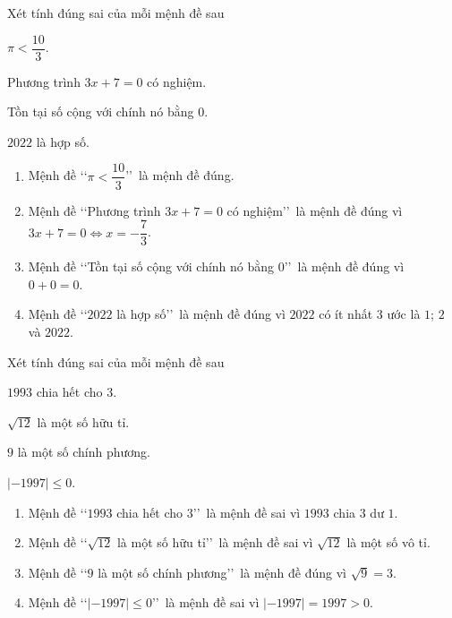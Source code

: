\begin{bt}%
	Xét tính đúng sai của mỗi mệnh đề sau
	\begin{listEX}[2]
		\item $\pi<\dfrac{10}{3}$.
		\item Phương trình $3x+7=0$ có nghiệm.
		\item Tồn tại số cộng với chính nó bằng $0$.
		\item $2022$ là hợp số.
	\end{listEX}
	\loigiai
	{
		\begin{enumerate}
			\item Mệnh đề \lq\lq  $\pi<\dfrac{10}{3}$\rq\rq\ là mệnh đề đúng.
			\item Mệnh đề \lq\lq  Phương trình $3x+7=0$ có nghiệm\rq\rq\ là mệnh đề đúng vì $3x+7=0 \Leftrightarrow x=-\dfrac{7}{3}$.
			\item Mệnh đề \lq\lq  Tồn tại số cộng với chính nó bằng $0$\rq\rq\ là mệnh đề đúng vì $0+0=0$.
			\item Mệnh đề \lq\lq  $2022$ là hợp số\rq\rq\ là mệnh đề đúng vì $2022$ có ít nhất $3$ ước là $1$; $2$ và $2022$.
		\end{enumerate}
	}
\end{bt}

\begin{bt}%
	Xét tính đúng sai của mỗi mệnh đề sau
	\begin{listEX}[2]
		\item $1993$ chia hết cho $3$.
		\item $\sqrt{12}$ là một số hữu tỉ.
		\item $9$ là một số chính phương.
		\item $|-1997|\leqslant0$.
	\end{listEX}
	\loigiai
	{
		\begin{enumerate}
			\item Mệnh đề \lq\lq  $1993$ chia hết cho $3$\rq\rq\ là mệnh đề sai vì $1993$ chia $3$ dư $1$.
			\item Mệnh đề \lq\lq  $\sqrt{12}$ là một số hữu tỉ\rq\rq\ là mệnh đề sai vì $\sqrt{12}$ là một số vô tỉ.
			\item Mệnh đề \lq\lq  $9$ là một số chính phương\rq\rq\ là mệnh đề đúng vì $\sqrt{9}=3$.
			\item Mệnh đề \lq\lq  $|-1997|\leqslant0$\rq\rq\ là mệnh đề sai vì $|-1997|=1997>0$.
		\end{enumerate}
	}
\end{bt}

